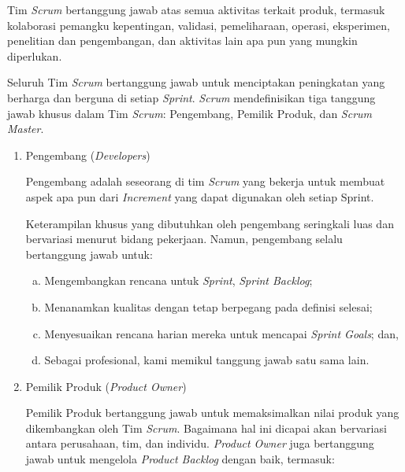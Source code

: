 	Tim \emph{Scrum} bertanggung jawab atas semua aktivitas terkait produk, termasuk kolaborasi pemangku kepentingan, validasi, pemeliharaan, operasi, eksperimen, penelitian dan pengembangan, dan aktivitas lain apa pun yang mungkin diperlukan.

	Seluruh Tim \emph{Scrum} bertanggung jawab untuk menciptakan peningkatan yang berharga dan berguna di setiap \emph{Sprint}. \emph{Scrum} mendefinisikan tiga tanggung jawab khusus dalam Tim \emph{Scrum}: Pengembang, Pemilik Produk, dan \emph{Scrum Master}.
	
	\begin{enumerate}
	
		\item Pengembang (\emph{Developers})
		
		Pengembang adalah seseorang di tim \emph{Scrum} yang bekerja untuk membuat aspek apa pun dari \emph{Increment} yang dapat digunakan oleh setiap Sprint.

		Keterampilan khusus yang dibutuhkan oleh pengembang seringkali luas dan bervariasi menurut bidang pekerjaan. Namun, pengembang selalu bertanggung jawab untuk:
		
		\begin{enumerate} [a.]
		
			\item Mengembangkan rencana untuk \emph{Sprint}, \emph{Sprint Backlog};

			\item Menanamkan kualitas dengan tetap berpegang pada definisi selesai;

			\item Menyesuaikan rencana harian mereka untuk mencapai \emph{Sprint Goals}; dan,

			\item Sebagai profesional, kami memikul tanggung jawab satu sama lain.
		
		\end{enumerate}
		
		\item Pemilik Produk (\emph{Product Owner})
		
		Pemilik Produk bertanggung jawab untuk memaksimalkan nilai produk yang dikembangkan oleh Tim \emph{Scrum}. Bagaimana hal ini dicapai akan bervariasi antara perusahaan, tim, dan individu. \emph{Product Owner} juga bertanggung jawab untuk mengelola \emph{Product Backlog} dengan baik, termasuk:
		
		\begin{enumerate} [a.]
		

\end{enumerate}
\end{enumerate}
